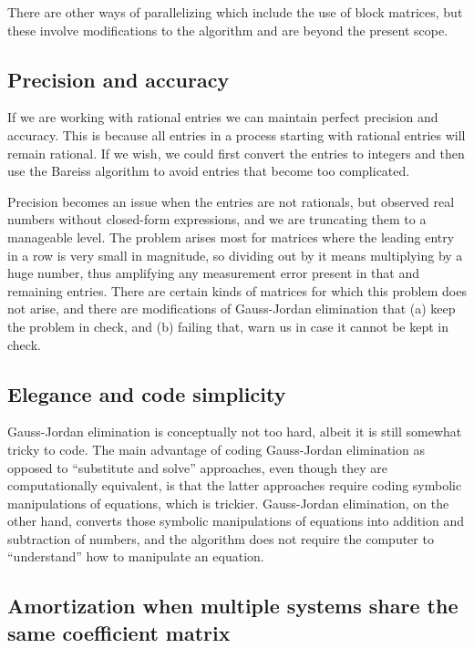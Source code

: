 \documentclass[10pt]{amsart}
\begin{document}
There are other ways of parallelizing which include the use of block
matrices, but these involve modifications to the algorithm and are
beyond the present scope.

\subsection{Precision and accuracy}

If we are working with rational entries we can maintain perfect
precision and accuracy. This is because all entries in a process starting with
rational entries will remain rational. If we wish, we could first
convert the entries to integers and then use the Bareiss algorithm to
avoid entries that become too complicated.

Precision becomes an issue when the entries are not rationals, but
observed real numbers without closed-form expressions, and we are
truncating them to a manageable level. The problem arises most for
matrices where the leading entry in a row is very small in magnitude,
so dividing out by it means multiplying by a huge number, thus
amplifying any measurement error present in that and remaining
entries. There are certain kinds of matrices for which this problem
does not arise, and there are modifications of Gauss-Jordan elimination
that (a) keep the problem in check, and (b) failing that, warn us in
case it cannot be kept in check.

\subsection{Elegance and code simplicity}

Gauss-Jordan elimination is conceptually not too hard, albeit it is still
somewhat tricky to code. The main advantage of coding Gauss-Jordan
elimination as opposed to ``substitute and solve'' approaches, even
though they are computationally equivalent, is that the latter
approaches require coding symbolic manipulations of equations, which
is trickier. Gauss-Jordan elimination, on the other hand, converts those
symbolic manipulations of equations into addition and subtraction of
numbers, and the algorithm does not require the computer to
``understand'' how to manipulate an equation.

\subsection{Amortization when multiple systems share the same coefficient matrix}
\end{document}
